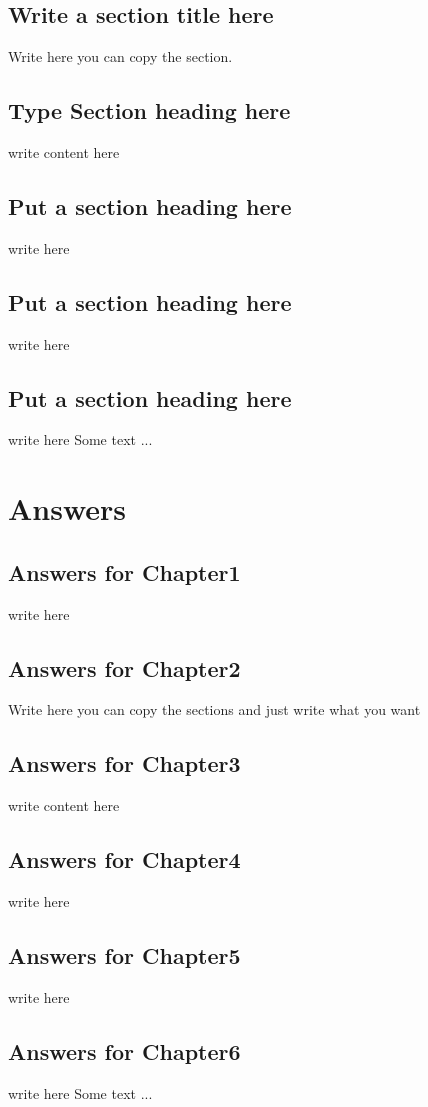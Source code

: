 \documentclass[a4paper,twoside]{scrbook}
\begin{document}
\section{Write a section title here}
Write here you can copy the section.
\section{Type Section heading here}
write content here
\section{Put a section heading here}
write here
\section{Put a section heading here}
write here
\section{Put a section heading here}
write here
Some text ...
\chapter{Answers}\label{ch19}
\section{Answers for Chapter1}\label{ch1}
write here
\section{Answers for Chapter2}\label{ch2}
Write here you can copy the sections and just write what you want
\section{Answers for Chapter3}\label{ch3}
write content here
\section{Answers for Chapter4}\label{ch4}
write here
\section{Answers for Chapter5}\label{ch5}
write here
\section{Answers for Chapter6}\label{ch6}
write here
Some text ...
\end{document}

